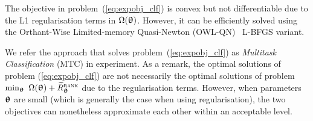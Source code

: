 The objective in problem~(\ref{eq:expobj_clf}) is convex but not differentiable due to the L1 regularisation terms in $\Omega({\bm{\uptheta}})$.
However, it can be efficiently solved using the Orthant-Wise Limited-memory Quasi-Newton (OWL-QN)~\cite{andrew2007scalable} L-BFGS variant.

We refer the approach that solves problem~(\ref{eq:expobj_clf}) as \emph{Multitask Classification} (MTC) in experiment.
As a remark, the optimal solutions of problem (\ref{eq:expobj_clf}) are not necessarily the optimal solutions 
of problem $\min_{\bm{\uptheta}} \ \Omega({\bm{\uptheta}}) + \widetilde R_{{\bm{\uptheta}}}^{\textsc{rank}}$ due to the regularisation terms.
However, when parameters ${\bm{\uptheta}}$ are small (which is generally the case when using regularisation), the two objectives 
can nonetheless approximate each other within an acceptable level.





%


